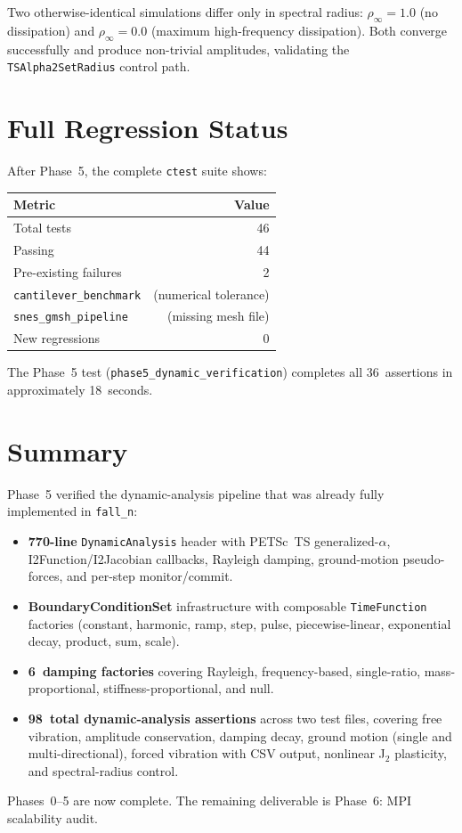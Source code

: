 Two otherwise-identical simulations differ only in spectral radius:
$\rho_\infty=1.0$ (no dissipation) and $\rho_\infty=0.0$ (maximum
high-frequency dissipation).  Both converge successfully and produce
non-trivial amplitudes, validating the
\texttt{TSAlpha2SetRadius} control path.


\section{Full Regression Status}
\label{sec:phase5-regression}

After Phase~5, the complete \texttt{ctest} suite shows:

\begin{center}
\begin{tabular}{lr}
\toprule
Metric & Value \\
\midrule
Total tests     & 46 \\
Passing         & 44 \\
Pre-existing failures & 2 \\
\quad\texttt{cantilever\_benchmark} & (numerical tolerance) \\
\quad\texttt{snes\_gmsh\_pipeline}  & (missing mesh file) \\
New regressions & 0 \\
\bottomrule
\end{tabular}
\end{center}

The Phase~5 test (\texttt{phase5\_dynamic\_verification}) completes
all 36~assertions in approximately 18~seconds.


\section{Summary}
\label{sec:phase5-summary}

Phase~5 verified the dynamic-analysis pipeline that was already
fully implemented in \texttt{fall\_n}:

\begin{itemize}
  \item \textbf{770-line} \texttt{DynamicAnalysis} header with
    PETSc~TS generalized-$\alpha$, I2Function/I2Jacobian callbacks,
    Rayleigh damping, ground-motion pseudo-forces, and per-step
    monitor/commit.
  \item \textbf{BoundaryConditionSet} infrastructure with composable
    \texttt{TimeFunction} factories (constant, harmonic, ramp,
    step, pulse, piecewise-linear, exponential decay, product,
    sum, scale).
  \item \textbf{6~damping factories} covering Rayleigh,
    frequency-based, single-ratio, mass-proportional,
    stiffness-proportional, and null.
  \item \textbf{98~total dynamic-analysis assertions} across two
    test files, covering free vibration, amplitude conservation,
    damping decay, ground motion (single and multi-directional),
    forced vibration with CSV output, nonlinear J$_2$ plasticity,
    and spectral-radius control.
\end{itemize}

Phases~0--5 are now complete.  The remaining deliverable is
Phase~6: MPI scalability audit.
